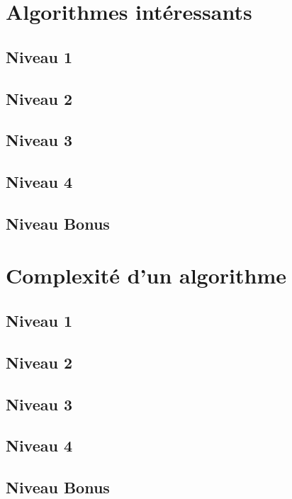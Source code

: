 \documentclass[a4paper]{report}
\begin{document}
		\section{Algorithmes intéressants}
		
			\subsection{Niveau 1}
		
			\subsection{Niveau 2}
		
			\subsection{Niveau 3}
			
			\subsection{Niveau 4}
			
			\subsection{Niveau Bonus}
		
		\section{Complexité d'un algorithme}
		
			\subsection{Niveau 1}
		
			\subsection{Niveau 2}
		
			\subsection{Niveau 3}
			
			\subsection{Niveau 4}
			
			\subsection{Niveau Bonus}
\end{document}
